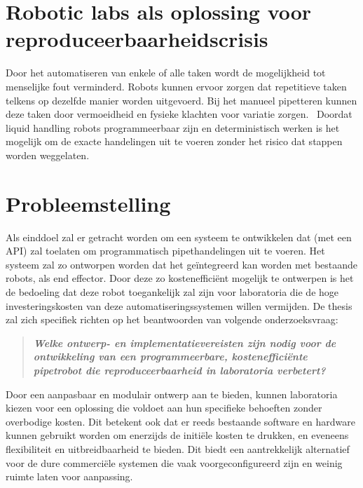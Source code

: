 \section{Robotic labs als oplossing voor reproduceerbaarheidscrisis}
Door het automatiseren van enkele of alle taken wordt de mogelijkheid tot menselijke fout verminderd. Robots kunnen ervoor zorgen dat repetitieve taken telkens op dezelfde manier worden uitgevoerd. Bij het manueel pipetteren kunnen deze taken door vermoeidheid en fysieke klachten voor variatie zorgen.\ \cite{RN9} Doordat liquid handling robots programmeerbaar zijn en deterministisch werken is het mogelijk om de exacte handelingen uit te voeren zonder het risico dat stappen worden weggelaten.

\section{Probleemstelling}
Als einddoel zal er getracht worden om een systeem te ontwikkelen dat (met een API) zal toelaten om programmatisch pipethandelingen uit te voeren. Het systeem zal zo ontworpen worden dat het geïntegreerd kan worden met bestaande robots, als end effector. Door deze zo kostenefficiënt mogelijk te ontwerpen is het de bedoeling dat deze robot toegankelijk zal zijn voor laboratoria die de hoge investeringskosten van deze automatiseringssystemen willen vermijden. De thesis zal zich specifiek richten op het beantwoorden van volgende onderzoeksvraag:\begin{quote}
    \begin{center}
        \textbf{\textit{Welke ontwerp- en implementatievereisten zijn nodig voor de ontwikkeling van een programmeerbare, kostenefficiënte pipetrobot die reproduceerbaarheid in laboratoria verbetert?}}
    \end{center}
\end{quote}
Door een aanpasbaar en modulair ontwerp aan te bieden, kunnen laboratoria kiezen voor een oplossing die voldoet aan hun specifieke behoeften zonder overbodige kosten. Dit betekent ook dat er reeds bestaande software en hardware kunnen gebruikt worden om enerzijds de initiële kosten te drukken, en eveneens flexibiliteit en uitbreidbaarheid te bieden. Dit biedt een aantrekkelijk alternatief voor de dure commerciële systemen die vaak voorgeconfigureerd zijn en weinig ruimte laten voor aanpassing.